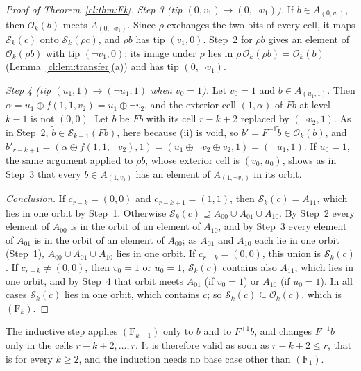 \begin{proof}[Proof of Theorem~\ref{cl:thm:Fk}]
\emph{Step 3 (tip $(0,v_1)\to(0,\neg v_1)$).} If $b\in A_{(0,v_1)}$, then $\mathcal O_k(b)$ meets $A_{(0,\neg v_1)}$. Since $\rho$ exchanges the two bits of every cell, it maps $\mathcal S_k(c)$ onto $\mathcal S_k(\rho c)$, and $\rho b$ has tip $(v_1,0)$. Step~2 for $\rho b$ gives an element of $\mathcal O_k(\rho b)$ with tip $(\neg v_1,0)$; its image under $\rho$ lies in $\rho\,\mathcal O_k(\rho b)=\mathcal O_k(b)$ (Lemma~\ref{cl:lem:transfer}(a)) and has tip $(0,\neg v_1)$.

\emph{Step 4 (tip $(u_1,1)\to(\neg u_1,1)$ when $v_0=1$).} Let $v_0=1$ and $b\in A_{(u_1,1)}$. Then $\alpha=u_1\oplus f(1,1,v_2)=u_1\oplus\neg v_2$, and the exterior cell $(1,\alpha)$ of $Fb$ at level $k-1$ is not $(0,0)$. Let $\tilde b$ be $Fb$ with its cell $r-k+2$ replaced by $(\neg v_2,1)$. As in Step~2, $\tilde b\in\mathcal S_{k-1}(Fb)$, here because (ii) is void, so $b'=F^{-1}\tilde b\in\mathcal O_k(b)$, and $b'_{r-k+1}=(\alpha\oplus f(1,1,\neg v_2),1)=(u_1\oplus\neg v_2\oplus v_2,1)=(\neg u_1,1)$. If $u_0=1$, the same argument applied to $\rho b$, whose exterior cell is $(v_0,u_0)$, shows as in Step~3 that every $b\in A_{(1,v_1)}$ has an element of $A_{(1,\neg v_1)}$ in its orbit.

\emph{Conclusion.} If $c_{r-k}=(0,0)$ and $c_{r-k+1}=(1,1)$, then $\mathcal S_k(c)=A_{11}$, which lies in one orbit by Step~1. Otherwise $\mathcal S_k(c)\supseteq A_{00}\cup A_{01}\cup A_{10}$. By Step~2 every element of $A_{00}$ is in the orbit of an element of $A_{10}$, and by Step~3 every element of $A_{01}$ is in the orbit of an element of $A_{00}$; as $A_{01}$ and $A_{10}$ each lie in one orbit (Step~1), $A_{00}\cup A_{01}\cup A_{10}$ lies in one orbit. If $c_{r-k}=(0,0)$, this union is $\mathcal S_k(c)$. If $c_{r-k}\ne(0,0)$, then $v_0=1$ or $u_0=1$, $\mathcal S_k(c)$ contains also $A_{11}$, which lies in one orbit, and by Step~4 that orbit meets $A_{01}$ (if $v_0=1$) or $A_{10}$ (if $u_0=1$). In all cases $\mathcal S_k(c)$ lies in one orbit, which contains $c$; so $\mathcal S_k(c)\subseteq\mathcal O_k(c)$, which is $(\mathrm F_k)$.
\end{proof}

\begin{remark}
The inductive step applies $(\mathrm F_{k-1})$ only to $b$ and to $F^{\pm1}b$, and changes $F^{\pm1}b$ only in the cells $r-k+2,\dots,r$. It is therefore valid as soon as $r-k+2\le r$, that is for every $k\ge2$, and the induction needs no base case other than $(\mathrm F_1)$.
\end{remark}

